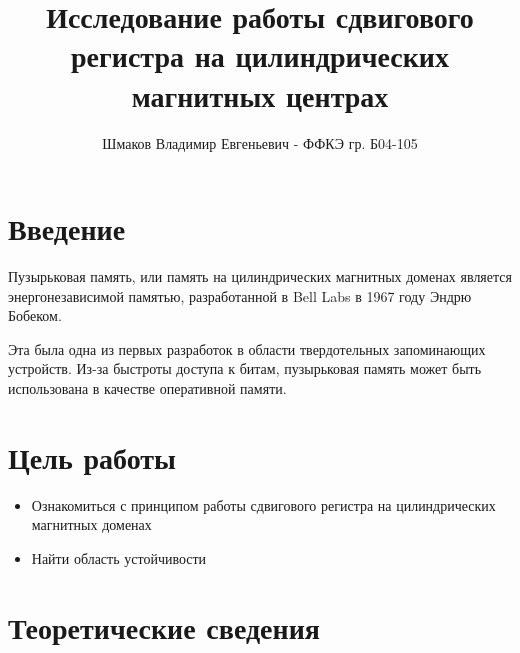 \documentclass[a4paper, 14pt]{extarticle}
\title{\textcolor{main_title}{Исследование работы сдвигового регистра на цилиндрических магнитных центрах}}
\author{Шмаков Владимир Евгеньевич - ФФКЭ гр. Б04-105}
\begin{document}
\maketitle

\section*{\textcolor{header}{Введение}}



Пузырьковая память, или память на цилиндрических магнитных доменах является энергонезависимой памятью, 
разработанной в Bell Labs в 1967 году \textcolor{defenition}{Эндрю Бобеком}.

Эта была одна из первых разработок в области твердотельных запоминающих устройств. 
Из-за быстроты доступа к битам, пузырьковая память может быть использована в качестве оперативной памяти.



\section*{\textcolor{header}{Цель работы}}
\begin{itemize}
    \item Ознакомиться с принципом работы сдвигового регистра на цилиндрических магнитных доменах
    \item Найти область устойчивости
\end{itemize}
\section*{\textcolor{header}{Теоретические сведения}}
\end{document}

